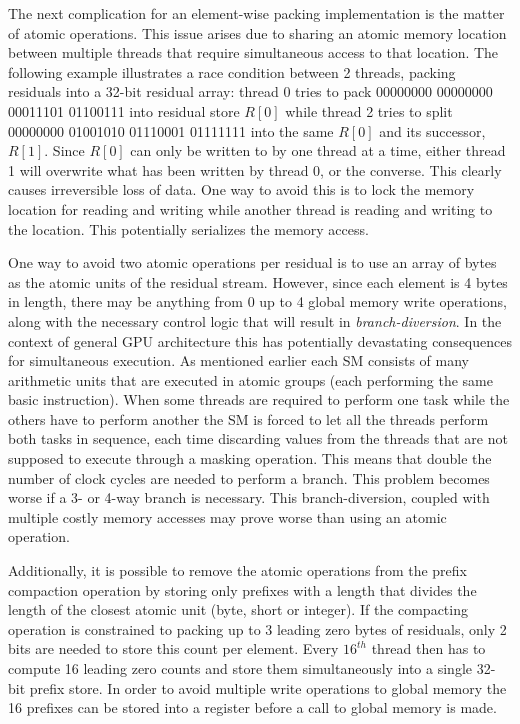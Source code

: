  The next complication for an element-wise packing implementation is the matter of atomic operations. This issue arises due to sharing an atomic memory location between multiple threads that require simultaneous access
 to that location. The following example illustrates a race condition between 2 threads, packing residuals into a 32-bit residual array: thread 0 tries to pack 00000000 00000000 00011101 01100111 into residual store 
 $R[0]$ while thread 2 tries to split 00000000 01001010 01110001 01111111 into the same $R[0]$ and its successor, $R[1]$. Since $R[0]$ can only be written to by one thread at a time, either thread 1 will overwrite what has
 been written by thread 0, or the converse. This clearly causes irreversible loss of data. One way to avoid this is to lock the memory location for reading and writing while another thread is reading and writing to the 
 location. This potentially serializes the memory access.
 
 One way to avoid two atomic operations per residual is to use an array of bytes as the atomic units of the residual stream. However, since each element is 4 bytes in length, there may be anything from 0 up to 4 global memory
 write operations, along with the necessary control logic that will result in \textit{branch-diversion}. In the context of general GPU architecture this has potentially devastating consequences for simultaneous execution. As mentioned
 earlier each SM consists of many arithmetic units that are executed in atomic groups (each performing the same basic instruction). When some threads are required to perform one task while the others have to perform another the
 SM is forced to let all the threads perform both tasks in sequence, each time discarding values from the threads that are not supposed to execute through a masking operation. This means that double the number of clock cycles are needed
 to perform a branch. This problem becomes worse if a 3- or 4-way branch is necessary. This branch-diversion, coupled with multiple costly memory accesses may prove worse than using an atomic operation. 
 
 Additionally, it is possible to remove the atomic operations from the prefix compaction operation by storing only prefixes with a length that divides the length of the closest atomic unit (byte, short or integer). If the compacting 
 operation is constrained to packing up to 3 leading zero bytes of residuals, only 2 bits are needed to store this count per element. Every $16^{th}$ thread then has to compute 16 leading zero counts and store them simultaneously 
 into a single 32-bit prefix store. In order to avoid multiple write operations to global memory the 16 prefixes can be stored into a register before a call to global memory is made.

